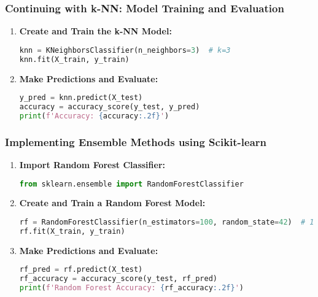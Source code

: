 \documentclass[aspectratio=169]{beamer}
\begin{document}
\begin{frame}[fragile]
    \frametitle{Continuing with k-NN: Model Training and Evaluation}
    \begin{enumerate}[resume]
        \item \textbf{Create and Train the k-NN Model:}
        \begin{lstlisting}[language=Python]
knn = KNeighborsClassifier(n_neighbors=3)  # k=3
knn.fit(X_train, y_train)
        \end{lstlisting}

        \item \textbf{Make Predictions and Evaluate:}
        \begin{lstlisting}[language=Python]
y_pred = knn.predict(X_test)
accuracy = accuracy_score(y_test, y_pred)
print(f'Accuracy: {accuracy:.2f}')
        \end{lstlisting}
    \end{enumerate}
\end{frame}

\begin{frame}[fragile]
    \frametitle{Implementing Ensemble Methods using Scikit-learn}
    \begin{enumerate}
        \item \textbf{Import Random Forest Classifier:}
        \begin{lstlisting}[language=Python]
from sklearn.ensemble import RandomForestClassifier
        \end{lstlisting}

        \item \textbf{Create and Train a Random Forest Model:}
        \begin{lstlisting}[language=Python]
rf = RandomForestClassifier(n_estimators=100, random_state=42)  # 100 trees
rf.fit(X_train, y_train)
        \end{lstlisting}

        \item \textbf{Make Predictions and Evaluate:}
        \begin{lstlisting}[language=Python]
rf_pred = rf.predict(X_test)
rf_accuracy = accuracy_score(y_test, rf_pred)
print(f'Random Forest Accuracy: {rf_accuracy:.2f}')
        \end{lstlisting}
    \end{enumerate}
\end{frame}
\end{document}
